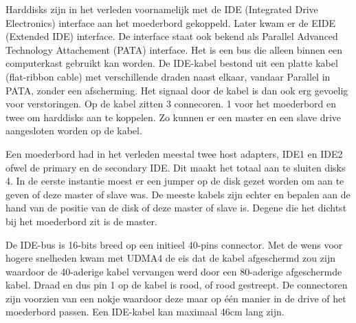 Harddisks zijn in het verleden voornamelijk met de IDE (Integrated Drive Electronics) interface aan het moederbord gekoppeld. Later kwam er de EIDE (Extended IDE) interface. De interface staat ook bekend als Parallel Advanced Technology Attachement (PATA) interface. Het is een bus die alleen binnen een computerkast gebruikt kan worden. De IDE-kabel bestond uit een platte kabel (flat-ribbon cable) met verschillende draden naast elkaar, vandaar Parallel in PATA, zonder een afscherming. Het signaal door de kabel is dan ook erg gevoelig voor verstoringen. Op de kabel zitten 3 connecoren. 1 voor het moederbord en twee om harddisks aan te koppelen. Zo kunnen er een master en een slave drive aangesloten worden op de kabel.

Een moederbord had in het verleden meestal twee host adapters, IDE1 en IDE2 ofwel de primary en de secondary IDE. Dit maakt het totaal aan te sluiten disks 4. In de eerste instantie moest er een jumper op de disk gezet worden om aan te geven of deze master of slave was. De meeste kabels zijn echter  en bepalen aan de hand van de positie van de disk of deze master of slave is. Degene die het dichtst bij het moederbord zit is de master.

De IDE-bus is 16-bits breed op een initieel 40-pins connector. Met de wens voor hogere snelheden kwam met UDMA4 de eis dat de kabel afgeschermd zou zijn waardoor de 40-aderige kabel vervangen werd door een 80-aderige afgeschermde kabel. Draad en dus pin 1 op de kabel is rood, of rood gestreept. De connectoren zijn voorzien van een nokje waardoor deze maar op \'e\'en manier in de drive of het moederbord passen. Een IDE-kabel kan maximaal 46cm lang zijn.

